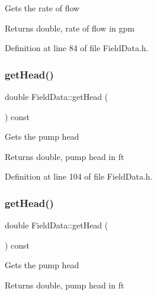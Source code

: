 Gets the rate of flow

\begin{DoxyReturn}{Returns}
double, rate of flow in gpm 
\end{DoxyReturn}


Definition at line 84 of file Field\+Data.\+h.

\mbox{\label{class_field_data_ac3e8e0b2de226c858b6c92cdb454bd0d}} 
\subsubsection{\texorpdfstring{get\+Head()}{getHead()}\hspace{0.1cm}{\footnotesize\ttfamily [1/3]}}
{\footnotesize\ttfamily double Field\+Data\+::get\+Head (\begin{DoxyParamCaption}{ }\end{DoxyParamCaption}) const\hspace{0.3cm}{\ttfamily [inline]}}

Gets the pump head

\begin{DoxyReturn}{Returns}
double, pump head in ft 
\end{DoxyReturn}


Definition at line 104 of file Field\+Data.\+h.

\mbox{\label{class_field_data_ac3e8e0b2de226c858b6c92cdb454bd0d}} 
\subsubsection{\texorpdfstring{get\+Head()}{getHead()}\hspace{0.1cm}{\footnotesize\ttfamily [2/3]}}
{\footnotesize\ttfamily double Field\+Data\+::get\+Head (\begin{DoxyParamCaption}{ }\end{DoxyParamCaption}) const\hspace{0.3cm}{\ttfamily [inline]}}

Gets the pump head

\begin{DoxyReturn}{Returns}
double, pump head in ft 
\end{DoxyReturn}


